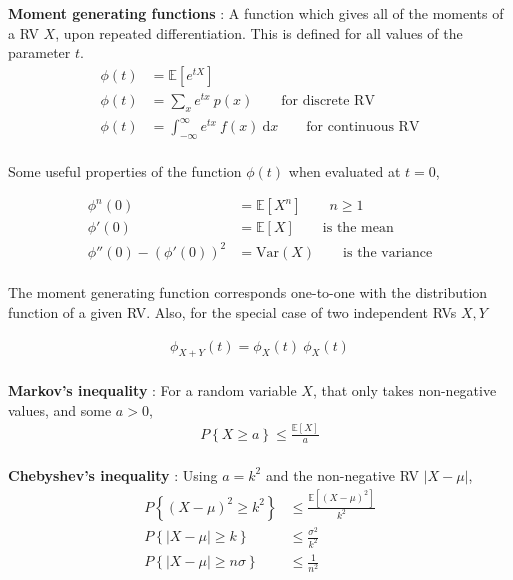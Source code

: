\textbf{Moment generating functions} : A function which gives all of the moments of a RV $ X $, upon repeated differentiation. This is defined for all values of the parameter $ t $.\\

\begin{align}
	\phi(t) &= \mathbb{E}[e^{tX}] \\
	\phi(t) &= \sum_{x} e^{tx} \ p(x) \qquad \text{for discrete RV} \\
	\phi(t) &= \int_{-\infty}^{\infty} e^{tx}\ f(x)\ \mathrm{d}x \qquad \text{for continuous RV} 
\end{align} \\

Some useful properties of the function $ \phi(t) $ when evaluated at $ t = 0 $,

\begin{align}
	\phi^n (0) &= \mathbb{E}[X^n] \qquad n \geq 1 \\
	\phi'(0) &= \mathbb{E}[X] \qquad \text{is the mean} \\
	\phi''(0) - \left(\phi'(0)\right)^2 &= \mathrm{Var}(X) \qquad \text{is the variance}
\end{align} \\

The moment generating function corresponds one-to-one with the distribution function of a given RV. Also, for the special case of two independent RVs $ X, Y $

\begin{align}
	\phi_{X + Y}(t) = 	\phi_{X}(t)\ \phi_{X}(t)
\end{align} \\

\textbf{Markov's inequality} : For a random variable $ X $, that only takes non-negative values, and some $ a > 0 $,\\
\begin{align}
	P\left\{ X \geq a \right\} \leq \frac{\mathbb{E}[X]}{a}
\end{align} \\

\textbf{Chebyshev's inequality} : Using $ a = k^2 $ and the non-negative RV $\left| X - \mu \right|$,\\
\begin{align}
	P\left\{( X - \mu)^2 \geq k^2 \right\} &\leq \frac{\mathbb{E}[(X - \mu)^2]}{k^2} \nonumber \\
	P\left\{\left| X - \mu \right| \geq k\right\} &\leq \frac{\sigma^2}{k^2} \nonumber \\
	P\left\{\left| X - \mu \right| \geq n\sigma \right\} &\leq \frac{1}{n^2}
\end{align} \\

